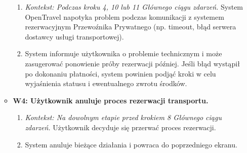 \documentclass[a4paper,12pt]{article}
\begin{document}
\begin{itemize}
\begin{itemize}
\begin{enumerate}
                    \item \textit{Kontekst: Podczas kroku 4, 10 lub 11 Głównego ciągu zdarzeń.} System OpenTravel napotyka problem podczas komunikacji z systemem rezerwacyjnym Przewoźnika Prywatnego (np. timeout, błąd serwera dostawcy usługi transportowej).
                    \item System informuje użytkownika o problemie technicznym i może zasugerować ponowienie próby rezerwacji później. Jeśli błąd wystąpił po dokonaniu płatności, system powinien podjąć kroki w celu wyjaśnienia statusu i ewentualnego zwrotu środków.
                \end{enumerate}
             \item \textbf{W4: Użytkownik anuluje proces rezerwacji transportu.}
                \begin{enumerate}
                    \item \textit{Kontekst: Na dowolnym etapie przed krokiem 8 Głównego ciągu zdarzeń.} Użytkownik decyduje się przerwać proces rezerwacji.
                    \item System anuluje bieżące działania i powraca do poprzedniego ekranu.
                \end{enumerate}
        \end{itemize}
\end{itemize}
\end{document}
